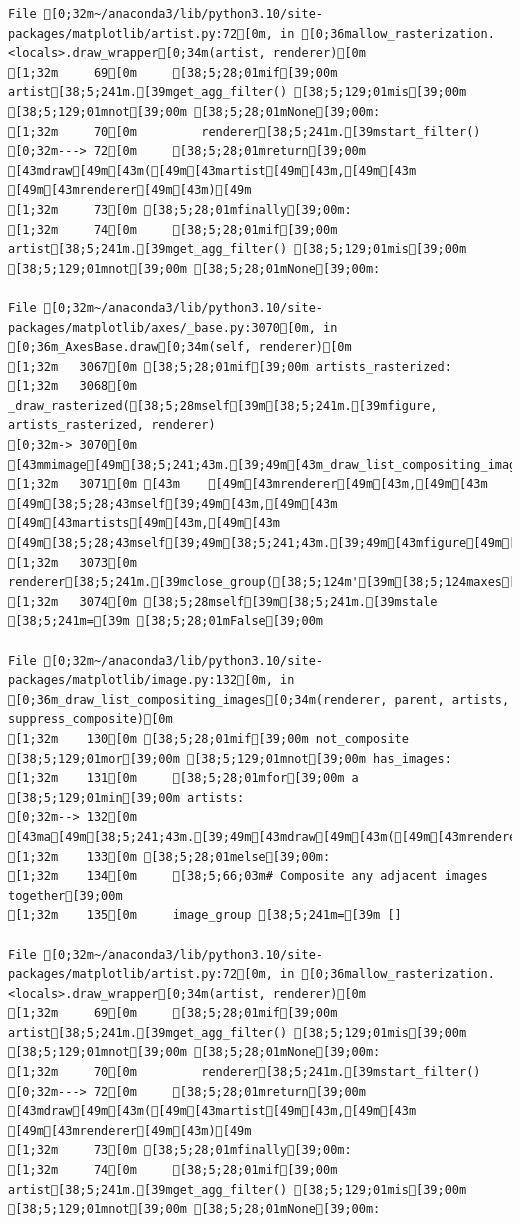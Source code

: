 \documentclass[
  letterpaper,
  DIV=11,
  numbers=noendperiod]{scrartcl}
\begin{document}
\begin{verbatim}
File [0;32m~/anaconda3/lib/python3.10/site-packages/matplotlib/artist.py:72[0m, in [0;36mallow_rasterization.<locals>.draw_wrapper[0;34m(artist, renderer)[0m
[1;32m     69[0m     [38;5;28;01mif[39;00m artist[38;5;241m.[39mget_agg_filter() [38;5;129;01mis[39;00m [38;5;129;01mnot[39;00m [38;5;28;01mNone[39;00m:
[1;32m     70[0m         renderer[38;5;241m.[39mstart_filter()
[0;32m---> 72[0m     [38;5;28;01mreturn[39;00m [43mdraw[49m[43m([49m[43martist[49m[43m,[49m[43m [49m[43mrenderer[49m[43m)[49m
[1;32m     73[0m [38;5;28;01mfinally[39;00m:
[1;32m     74[0m     [38;5;28;01mif[39;00m artist[38;5;241m.[39mget_agg_filter() [38;5;129;01mis[39;00m [38;5;129;01mnot[39;00m [38;5;28;01mNone[39;00m:

File [0;32m~/anaconda3/lib/python3.10/site-packages/matplotlib/axes/_base.py:3070[0m, in [0;36m_AxesBase.draw[0;34m(self, renderer)[0m
[1;32m   3067[0m [38;5;28;01mif[39;00m artists_rasterized:
[1;32m   3068[0m     _draw_rasterized([38;5;28mself[39m[38;5;241m.[39mfigure, artists_rasterized, renderer)
[0;32m-> 3070[0m [43mmimage[49m[38;5;241;43m.[39;49m[43m_draw_list_compositing_images[49m[43m([49m
[1;32m   3071[0m [43m    [49m[43mrenderer[49m[43m,[49m[43m [49m[38;5;28;43mself[39;49m[43m,[49m[43m [49m[43martists[49m[43m,[49m[43m [49m[38;5;28;43mself[39;49m[38;5;241;43m.[39;49m[43mfigure[49m[38;5;241;43m.[39;49m[43msuppressComposite[49m[43m)[49m
[1;32m   3073[0m renderer[38;5;241m.[39mclose_group([38;5;124m'[39m[38;5;124maxes[39m[38;5;124m'[39m)
[1;32m   3074[0m [38;5;28mself[39m[38;5;241m.[39mstale [38;5;241m=[39m [38;5;28;01mFalse[39;00m

File [0;32m~/anaconda3/lib/python3.10/site-packages/matplotlib/image.py:132[0m, in [0;36m_draw_list_compositing_images[0;34m(renderer, parent, artists, suppress_composite)[0m
[1;32m    130[0m [38;5;28;01mif[39;00m not_composite [38;5;129;01mor[39;00m [38;5;129;01mnot[39;00m has_images:
[1;32m    131[0m     [38;5;28;01mfor[39;00m a [38;5;129;01min[39;00m artists:
[0;32m--> 132[0m         [43ma[49m[38;5;241;43m.[39;49m[43mdraw[49m[43m([49m[43mrenderer[49m[43m)[49m
[1;32m    133[0m [38;5;28;01melse[39;00m:
[1;32m    134[0m     [38;5;66;03m# Composite any adjacent images together[39;00m
[1;32m    135[0m     image_group [38;5;241m=[39m []

File [0;32m~/anaconda3/lib/python3.10/site-packages/matplotlib/artist.py:72[0m, in [0;36mallow_rasterization.<locals>.draw_wrapper[0;34m(artist, renderer)[0m
[1;32m     69[0m     [38;5;28;01mif[39;00m artist[38;5;241m.[39mget_agg_filter() [38;5;129;01mis[39;00m [38;5;129;01mnot[39;00m [38;5;28;01mNone[39;00m:
[1;32m     70[0m         renderer[38;5;241m.[39mstart_filter()
[0;32m---> 72[0m     [38;5;28;01mreturn[39;00m [43mdraw[49m[43m([49m[43martist[49m[43m,[49m[43m [49m[43mrenderer[49m[43m)[49m
[1;32m     73[0m [38;5;28;01mfinally[39;00m:
[1;32m     74[0m     [38;5;28;01mif[39;00m artist[38;5;241m.[39mget_agg_filter() [38;5;129;01mis[39;00m [38;5;129;01mnot[39;00m [38;5;28;01mNone[39;00m:


\end{verbatim}
\end{document}
